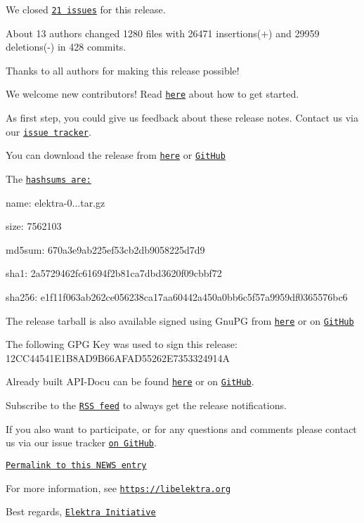 We closed \href{https://github.com/ElektraInitiative/libelektra/milestone/25?closed=1}{\tt 21 issues} for this release.

About 13 authors changed 1280 files with 26471 insertions(+) and 29959 deletions(-\/) in 428 commits.

Thanks to all authors for making this release possible!

We welcome new contributors! Read \href{https://www.libelektra.org/devgettingstarted/ideas}{\tt here} about how to get started.

As first step, you could give us feedback about these release notes. Contact us via our \href{https://issues.libelektra.org}{\tt issue tracker}.

You can download the release from \href{https://www.libelektra.org/ftp/elektra/releases/elektra-0.9.4.tar.gz}{\tt here} or \href{https://github.com/ElektraInitiative/ftp/blob/master/releases/elektra-0.9.4.tar.gz?raw=true}{\tt Git\+Hub}

The \href{https://github.com/ElektraInitiative/ftp/blob/master/releases/elektra-0.9.4.tar.gz.hashsum?raw=true}{\tt hashsums are\+:}


\begin{DoxyItemize}
\item name\+: elektra-\/0...\+tar.\+gz
\item size\+: 7562103
\item md5sum\+: 670a3e9ab225ef53cb2db9058225d7d9
\item sha1\+: 2a5729462fc61694f2b81ca7dbd3620f09cbbf72
\item sha256\+: e1f11f063ab262ce056238ca17aa60442a450a0bb6c5f57a9959df0365576bc6
\end{DoxyItemize}

The release tarball is also available signed using Gnu\+PG from \href{https://www.libelektra.org/ftp/elektra/releases/elektra-0.9.4.tar.gz.gpg}{\tt here} or on \href{https://github.com/ElektraInitiative/ftp/blob/master/releases/elektra-0.9.4.tar.gz.gpg?raw=true}{\tt Git\+Hub}

The following G\+PG Key was used to sign this release\+: 12\+C\+C44541\+E1\+B8\+A\+D9\+B66\+A\+F\+A\+D55262\+E7353324914A

Already built A\+P\+I-\/\+Docu can be found \href{https://doc.libelektra.org/api/0.9.4/html/}{\tt here} or on \href{https://github.com/ElektraInitiative/doc/tree/master/api/0.9.4}{\tt Git\+Hub}.

Subscribe to the \href{https://www.libelektra.org/news/feed.rss}{\tt R\+SS feed} to always get the release notifications.

If you also want to participate, or for any questions and comments please contact us via our issue tracker \href{http://issues.libelektra.org}{\tt on Git\+Hub}.

\href{https://www.libelektra.org/news/0.9.4-release}{\tt Permalink to this N\+E\+WS entry}

For more information, see \href{https://libelektra.org}{\tt https\+://libelektra.\+org}

Best regards, \href{https://www.libelektra.org/developers/authors}{\tt Elektra Initiative} 